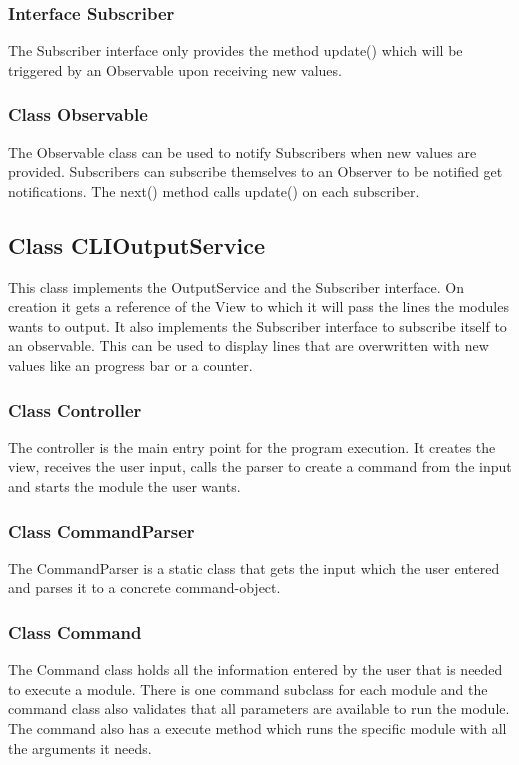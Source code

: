 \documentclass[parskip=full]{scrartcl}
\begin{document}
 \subsubsection{Interface Subscriber}
The Subscriber interface only provides the method update() which will be triggered by an Observable upon receiving new values.

\subsubsection{Class Observable} 
The Observable class can be used to notify Subscribers when new values are provided.
Subscribers can subscribe themselves to an Observer to be notified get notifications.
The next() method calls update() on each subscriber.

\subsection{Class CLIOutputService}
This class implements the OutputService and the Subscriber interface. 
On creation it gets a reference of the View to which it will pass the lines the modules wants to output.
It also implements the Subscriber interface to subscribe itself to an observable.
This can be used to display lines that are overwritten with new values like an progress bar or a counter.

\subsubsection{Class Controller} 
The controller is the main entry point for the program execution. 
It creates the view, receives the user input, calls the parser to create a command from the input and starts the module the user wants.

\subsubsection{Class CommandParser}
The CommandParser is a static class that gets the input which the user entered and parses it to a concrete command-object.

\subsubsection{Class Command}
The Command class holds all the information entered by the user that is needed to execute a module.
There is one command subclass for each module and the command class also validates that all parameters are available to run the module.
The command also has a execute method which runs the specific module with all the arguments it needs.
\end{document}
